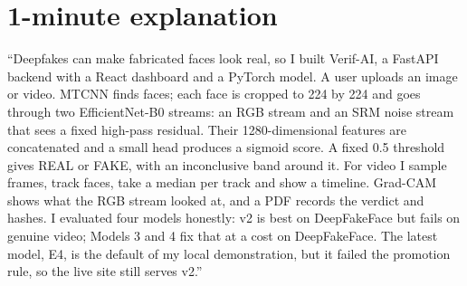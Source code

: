 \documentclass[11pt,a4paper]{report}
\begin{document}
\section{1-minute explanation}
\begin{sayit}
``Deepfakes can make fabricated faces look real, so I built Verif-AI, a FastAPI backend with a React dashboard and a PyTorch model. A user uploads an image or video. MTCNN finds faces; each face is cropped to 224 by 224 and goes through two EfficientNet-B0 streams: an RGB stream and an SRM noise stream that sees a fixed high-pass residual. Their 1280-dimensional features are concatenated and a small head produces a sigmoid score. A fixed 0.5 threshold gives REAL or FAKE, with an inconclusive band around it. For video I sample frames, track faces, take a median per track and show a timeline. Grad-CAM shows what the RGB stream looked at, and a PDF records the verdict and hashes.
I evaluated four models honestly: v2 is best on DeepFakeFace but fails on genuine video; Models 3 and 4 fix that at a cost on DeepFakeFace. The latest model, E4, is the default of my local demonstration, but it failed the promotion rule, so the live site still serves v2.''
\end{sayit}
\end{document}
